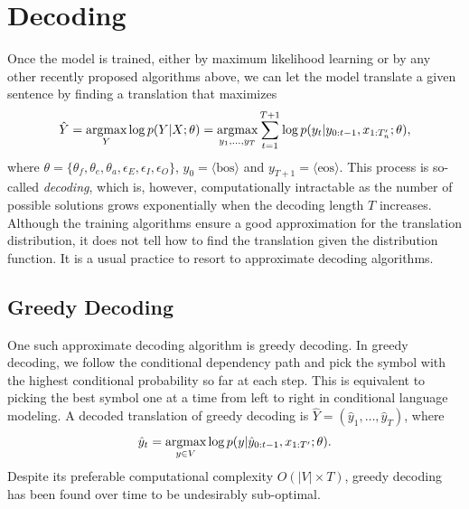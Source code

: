 \section{Decoding}
Once the model is trained, either by maximum likelihood learning or by any other recently proposed algorithms above, we can let the model translate a given sentence by finding a translation that maximizes 
\begin{equation}
\hat{Y} = \mathop{\text{argmax}}_{Y} \log p(Y|X; \theta) =\mathop{\text{argmax}}_{y_1, ..., y_T}\sum_{t=1}^{T+1} \log p(y_t| y_{0:t-1}, x_{1:T'_n}; \theta),
\end{equation}
where $\theta=\{\theta_f, \theta_e, \theta_a, \epsilon_E, \epsilon_I, \epsilon_O \}$, $y_0 = \langle \mathrm{bos}\rangle$ and $y_{T+1} = \langle \mathrm{eos}\rangle$. This process is so-called \textit{decoding}, which is, however, computationally intractable as the number of possible solutions grows exponentially when the decoding length $T$ increases. Although the training algorithms ensure a good approximation for the translation distribution, it does not tell how to find the translation given the distribution function. It is a usual practice to resort to approximate decoding algorithms.

\subsection{Greedy Decoding}

One such approximate decoding algorithm is greedy decoding. In greedy decoding, we follow the conditional dependency path and pick the symbol with the highest conditional probability so far at each step. This is equivalent to picking the best symbol one at a time from left to right in conditional language modeling. A decoded translation of greedy decoding is $\hat{Y} = (\hat{y}_1, \ldots, \hat{y}_T)$, where
\begin{equation}
\hat{y}_t =  \mathop{\text{argmax}}_{y \in V} \log p(y|\hat{y}_{0:t-1}, x_{1:T'}; \theta).
\end{equation}
Despite its preferable computational complexity $O(|V| \times T)$, greedy decoding has been found over time to be undesirably sub-optimal.%

